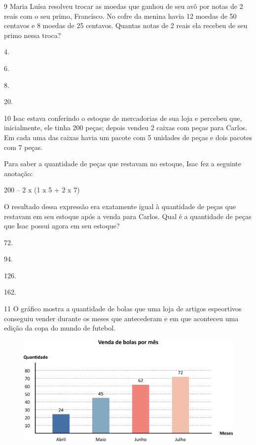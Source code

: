 \num{9} Maria Luísa resolveu trocar as moedas que ganhou de seu avô por notas de
2 reais com o seu primo, Francisco. No cofre da menina havia 12 moedas de 50
centavos e 8 moedas de 25 centavos. Quantas notas de 2 reais ela recebeu
de seu primo nessa troca?

\begin{escolha}
\item
  4.
\item
  6.
\item
  8.
\item
  20.
\end{escolha}

\num{10} Isac estava conferindo o estoque de mercadorias de sua loja e percebeu que, inicialmente, ele tinha 200 peças; depois vendeu 2 caixas com peças para Carlos. Em cada uma das caixas havia um pacote com 5 unidades de peças e dois pacotes com 7 peças.

Para saber a quantidade de peças que restavam no estoque, Isac fez a seguinte anotação:

\begin{myquote}
200 -- 2 x (1 x 5 + 2 x 7)
\end{myquote}

\pagebreak
O resultado dessa expressão era exatamente igual à quantidade de peças que restavam em seu estoque após a venda para Carlos. Qual é a quantidade de peças que Isac possui agora em seu estoque?

\begin{multicols}{2}
\begin{escolha}
\item
  72.
\item
  94.
\item
  126.
\item
  162.
\end{escolha}
\end{multicols}



\num{11} O gráfico mostra a quantidade de bolas que uma loja de artigos espeortivos conseguiu vender durante os meses que antecederam e em que aconteceu uma edição da copa do mundo de futebol.

\begin{figure}[htpb!]
\centering
\includegraphics[width=\textwidth]{./media/image105.png}
\end{figure}

